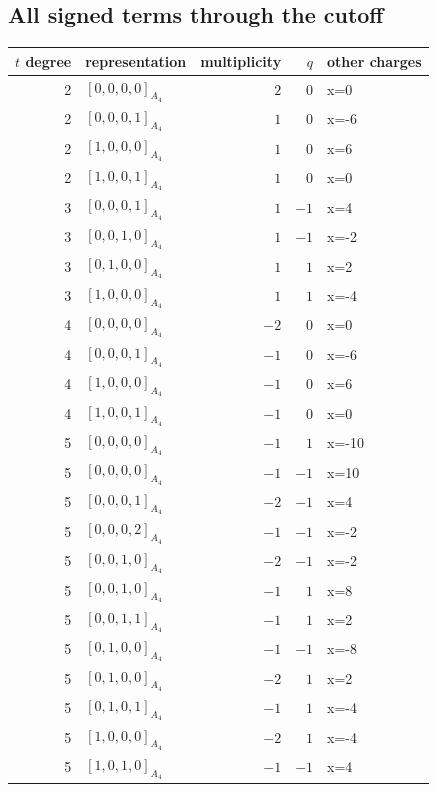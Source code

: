 \documentclass[11pt]{article}
\newcommand{\Dynkin}[1]{#1}
\begin{document}
\subsection{All signed terms through the cutoff}
\begin{longtable}{r l r r l}
\toprule $t$ degree & representation & multiplicity & $q$ & other charges\\\midrule\endhead
2 & $\Dynkin{[0,0,0,0]_{A_4}}$ & $2$ & $0$ & x=0\\
2 & $\Dynkin{[0,0,0,1]_{A_4}}$ & $1$ & $0$ & x=-6\\
2 & $\Dynkin{[1,0,0,0]_{A_4}}$ & $1$ & $0$ & x=6\\
2 & $\Dynkin{[1,0,0,1]_{A_4}}$ & $1$ & $0$ & x=0\\
3 & $\Dynkin{[0,0,0,1]_{A_4}}$ & $1$ & $-1$ & x=4\\
3 & $\Dynkin{[0,0,1,0]_{A_4}}$ & $1$ & $-1$ & x=-2\\
3 & $\Dynkin{[0,1,0,0]_{A_4}}$ & $1$ & $1$ & x=2\\
3 & $\Dynkin{[1,0,0,0]_{A_4}}$ & $1$ & $1$ & x=-4\\
4 & $\Dynkin{[0,0,0,0]_{A_4}}$ & $-2$ & $0$ & x=0\\
4 & $\Dynkin{[0,0,0,1]_{A_4}}$ & $-1$ & $0$ & x=-6\\
4 & $\Dynkin{[1,0,0,0]_{A_4}}$ & $-1$ & $0$ & x=6\\
4 & $\Dynkin{[1,0,0,1]_{A_4}}$ & $-1$ & $0$ & x=0\\
5 & $\Dynkin{[0,0,0,0]_{A_4}}$ & $-1$ & $1$ & x=-10\\
5 & $\Dynkin{[0,0,0,0]_{A_4}}$ & $-1$ & $-1$ & x=10\\
5 & $\Dynkin{[0,0,0,1]_{A_4}}$ & $-2$ & $-1$ & x=4\\
5 & $\Dynkin{[0,0,0,2]_{A_4}}$ & $-1$ & $-1$ & x=-2\\
5 & $\Dynkin{[0,0,1,0]_{A_4}}$ & $-2$ & $-1$ & x=-2\\
5 & $\Dynkin{[0,0,1,0]_{A_4}}$ & $-1$ & $1$ & x=8\\
5 & $\Dynkin{[0,0,1,1]_{A_4}}$ & $-1$ & $1$ & x=2\\
5 & $\Dynkin{[0,1,0,0]_{A_4}}$ & $-1$ & $-1$ & x=-8\\
5 & $\Dynkin{[0,1,0,0]_{A_4}}$ & $-2$ & $1$ & x=2\\
5 & $\Dynkin{[0,1,0,1]_{A_4}}$ & $-1$ & $1$ & x=-4\\
5 & $\Dynkin{[1,0,0,0]_{A_4}}$ & $-2$ & $1$ & x=-4\\
5 & $\Dynkin{[1,0,1,0]_{A_4}}$ & $-1$ & $-1$ & x=4\\

\end{longtable}
\end{document}
